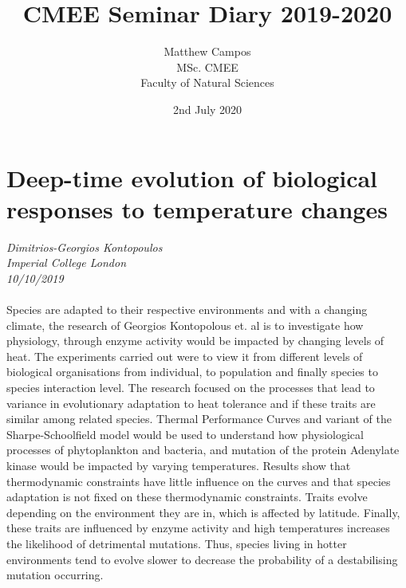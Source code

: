 \documentclass[11pt]{article}
\title{CMEE Seminar Diary 2019-2020}
\author{Matthew Campos\\MSc. CMEE\\Faculty of Natural Sciences}
\date{2nd July 2020}
\begin{document}
    \maketitle

\newpage

\section{Deep-time evolution of biological responses to temperature changes}
\textit{Dimitrios-Georgios Kontopoulos\\Imperial College London\\10/10/2019}
\\
\\Species are adapted to their respective environments and with a changing climate, the research of Georgios Kontopolous et. al is to investigate how physiology, through enzyme activity would be impacted by changing levels of heat. The experiments carried out were to view it from different levels of biological organisations from individual, to population and finally species to species interaction level. The research focused on the processes that lead to variance in evolutionary adaptation to heat tolerance and if these traits are similar among related species. Thermal Performance Curves and variant of the Sharpe-Schoolfield model would be used to understand how physiological processes of phytoplankton and bacteria, and mutation of the protein Adenylate kinase would be impacted by varying temperatures. Results show that thermodynamic constraints have little influence on the curves and that species adaptation is not fixed on these thermodynamic constraints. Traits evolve depending on the environment they are in, which is affected by latitude. Finally, these traits are influenced by enzyme activity and high temperatures increases the likelihood of detrimental mutations. Thus, species living in hotter environments tend to evolve slower to decrease the probability of a destabilising mutation occurring.
\end{document}
